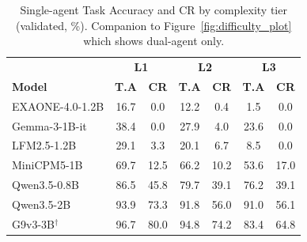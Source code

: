 \begin{table}[h]
\centering
\small
\caption{Single-agent Task Accuracy and CR by complexity tier (validated, \%). Companion to Figure~\ref{fig:difficulty_plot} which shows dual-agent only.}
\label{tab:single_tier_results}
\begin{tabular}{@{}l|cc|cc|cc@{}}
\toprule
& \multicolumn{2}{c|}{\textbf{L1}} & \multicolumn{2}{c|}{\textbf{L2}} & \multicolumn{2}{c}{\textbf{L3}} \\
\textbf{Model} & \textbf{T.A} & \textbf{CR} & \textbf{T.A} & \textbf{CR} & \textbf{T.A} & \textbf{CR} \\
\midrule
EXAONE-4.0-1.2B & 16.7 & 0.0 & 12.2 & 0.4 & 1.5 & 0.0 \\
Gemma-3-1B-it & 38.4 & 0.0 & 27.9 & 4.0 & 23.6 & 0.0 \\
LFM2.5-1.2B & 29.1 & 3.3 & 20.1 & 6.7 & 8.5 & 0.0 \\
MiniCPM5-1B & 69.7 & 12.5 & 66.2 & 10.2 & 53.6 & 17.0 \\
Qwen3.5-0.8B & 86.5 & 45.8 & 79.7 & 39.1 & 76.2 & 39.1 \\
Qwen3.5-2B & 93.9 & 73.3 & 91.8 & 56.0 & 91.0 & 56.1 \\
G9v3-3B$^\dagger$ & 96.7 & 80.0 & 94.8 & 74.2 & 83.4 & 64.8 \\
\bottomrule
\end{tabular}
\end{table}